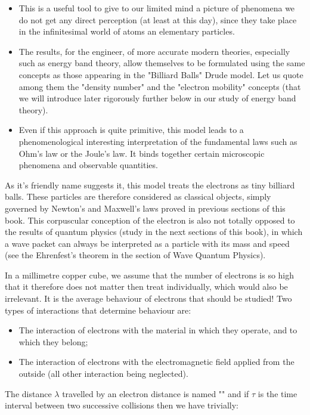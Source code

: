 	\begin{itemize}
		\item This is a useful tool to give to our limited mind a picture of phenomena we do not get any direct perception (at least at this day), since they take place in the infinitesimal world of atoms an elementary particles.

		\item The results, for the engineer, of more accurate modern theories, especially such as energy band theory, allow themselves to be formulated using the same concepts as those appearing in the "Billiard Balls" Drude model. Let us quote among them the "density number" and the "electron mobility" concepts (that we will introduce later rigorously further below in our study of energy band theory).

		\item Even if this approach is quite primitive, this model leads to a phenomenological interesting interpretation of the fundamental laws such as Ohm's law or the Joule's law. It binds together certain microscopic phenomena and observable quantities.
	\end{itemize}
	As it's friendly name suggests it, this model treats the electrons as tiny billiard balls. These particles are therefore considered as classical objects, simply governed by Newton's and Maxwell's laws proved in previous sections of this book. This corpuscular conception of the electron is also not totally opposed to the results of quantum physics (study in the next sections of this book), in which a wave packet can always be interpreted as a particle with its mass and speed (see the Ehrenfest's theorem in the section of Wave Quantum Physics).
	
	In a millimetre copper cube, we assume that the number of electrons is so high that it therefore does not matter then treat individually, which would also be irrelevant. It is the average behaviour of electrons that should be studied! Two types of interactions that determine behaviour are:
	
	\begin{itemize}
		\item The interaction of electrons with the material in which they operate, and to which they belong;
	
		\item The interaction of electrons with the electromagnetic field applied from the outside (all other interaction being neglected).
	\end{itemize}
	The distance $\lambda$ travelled by an electron distance is named "" and if $\tau$ is the time interval between two successive collisions then we have trivially:
	
